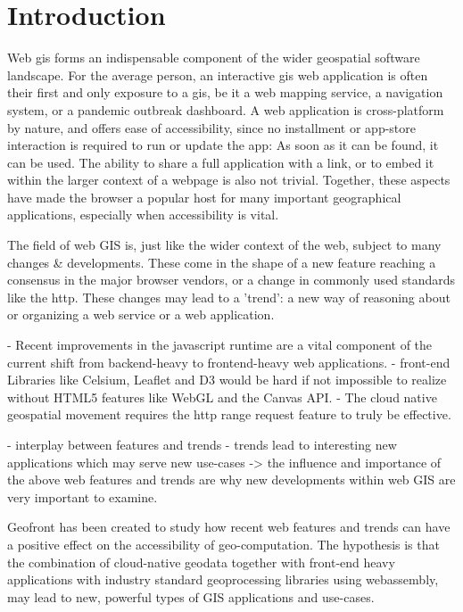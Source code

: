 \chapter{Introduction}
Web \ac{gis} forms an indispensable component of the wider geospatial software landscape. 
For the average person, an interactive \ac{gis} web application is often their first and only exposure to a \acs{gis}, be it a web mapping service, a navigation system, or a pandemic outbreak dashboard. 
A web application is cross-platform by nature, and offers ease of accessibility, since no installment or app-store interaction is required to run or update the app: 
As soon as it can be found, it can be used.
The ability to share a full application with a link, or to embed it within the larger context of a webpage is also not trivial. 
Together, these aspects have made the browser a popular host for many important geographical applications, especially when accessibility is vital.

The field of web GIS is, just like the wider context of the web, subject to many changes \& developments. 
These come in the shape of a new feature reaching a consensus in the major browser vendors, or a change in commonly used standards like the \ac{http}.
These changes may lead to a 'trend': a new way of reasoning about or organizing a web service or a web application.

- Recent improvements in the javascript runtime are a vital component of the current shift from backend-heavy to frontend-heavy web applications. 
- front-end Libraries like Celsium, Leaflet and D3 would be hard if not impossible to realize without HTML5 features like WebGL and the Canvas API.
- The cloud native geospatial movement requires the http range request feature to truly be effective.

- interplay between features and trends 
- trends lead to interesting new applications which may serve new use-cases
-> the influence and importance of the above web features and trends are why new developments within web GIS are very important to examine. 



Geofront has been created to study how recent web features and trends can have a positive effect on the accessibility of geo-computation. 
The hypothesis is that the combination of cloud-native geodata together with front-end heavy applications with industry standard geoprocessing libraries using webassembly, may lead to new, powerful types of GIS applications and use-cases. 

